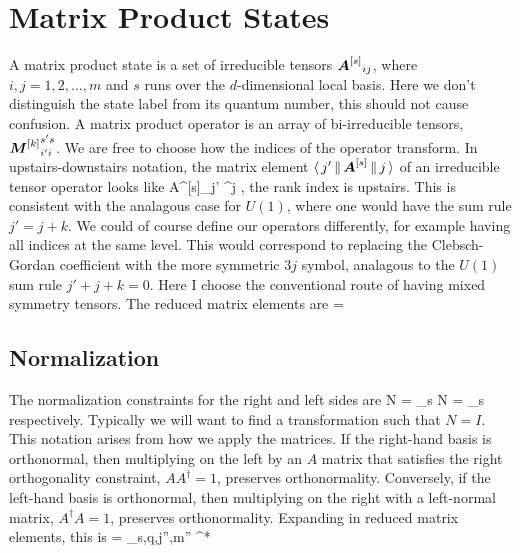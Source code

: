 \documentclass{article}[10pt]
\begin{document}
\section{Matrix Product States}

A matrix product state is a set of irreducible tensors
$\hbox{$\mbox{\boldmath $A$}^{[s]}$}_{ij}$, where $i,j = 1,2,\ldots,m$ and $s$ runs over
the $d$-dimensional local basis. Here we don't distinguish the state label from
its quantum number, this should not cause confusion. A matrix product operator is
an array of bi-irreducible tensors, $\hbox{$\mbox{\boldmath $M$}^{[k]}$}^{s's}_{i'i}$. 
We are free to choose how the indices of the operator transform.
In upstairs-downstairs notation, the matrix element
$\langle \, j' \, \| \, \hbox{$\mbox{\boldmath $A$}^{[s]}$} \, \| \, j \, \rangle$ of an irreducible tensor operator 
looks like
\beq
A^{[s]}_{j'} {}^{j}
\eeq
\ie, the rank index is upstairs. This is consistent with the
analagous case for $U(1)$, where one would have the sum rule
$j' = j+k$. We could of course define our operators differently,
for example having all indices at the same level.  This would correspond
to replacing the Clebsch-Gordan coefficient with the more symmetric
$3j$ symbol, analagous to the $U(1)$ sum rule $j'+j+k=0$. 
Here I choose the conventional route of having mixed symmetry tensors.
The reduced matrix elements are
\beq
{} =  \;
\eeq

\subsection{Normalization}

The normalization constraints for the right and left sides are
\beq
N = \sum_s  
\label{eq:staterightnorm}
\eeq
\beq
N = \sum_s  
\eeq
respectively. Typically we will want to find a transformation such
that $N = I$.
This notation arises from how we apply the matrices. If the right-hand basis
is orthonormal, then multiplying on the left by an $A$ matrix that satisfies the right orthogonality
constraint, $AA^\dagger = 1$, preserves orthonormality.  Conversely, if the left-hand basis
is orthonormal, then multiplying on the right with a left-normal matrix, $A^\dagger A = 1$, 
preserves orthonormality.
Expanding  in reduced matrix elements, this is
\beq
{} = 
\sum_{s,q,j'',m''} 
^*
\eeq
\end{document}
